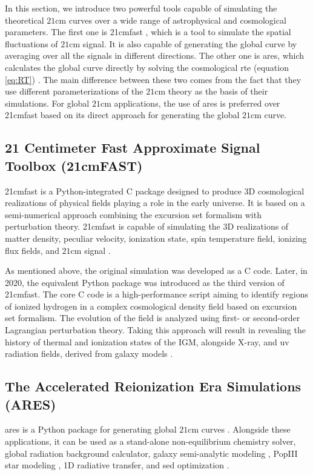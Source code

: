 \documentclass[12pt, TexShade, letterpaper]{report}
\begin{document}
In this section, we introduce two powerful tools capable of simulating the theoretical $\mathrm{21cm}$ curves over a wide range of astrophysical and cosmological parameters. The first one is \gls{21cmfast} \cite{21cmfast_c, 21cmfast_python}, which is a tool to simulate the spatial fluctuations of $\mathrm{21cm}$ signal. It is also capable of generating the global curve by averaging over all the signals in different directions. The other one is \gls{ares}, which calculates the global curve directly by solving the cosmological \gls{rte} (equation \ref{eq:RT}) \cite{ares2014jordan}. The main difference between these two comes from the fact that they use different parameterizations of the $\mathrm{21cm}$ theory as the basis of their simulations. For global $\mathrm{21cm}$ applications, the use of \gls{ares} is preferred over \gls{21cmfast} based on its direct approach for generating the global $\mathrm{21cm}$ curve. \par

\subsection{21 Centimeter Fast Approximate Signal Toolbox (21cmFAST)}
\gls{21cmfast} is a Python-integrated C package designed to produce 3D cosmological realizations of physical fields playing a role in the early universe. It is based on a semi-numerical approach combining the excursion set formalism with perturbation theory. \gls{21cmfast} is capable of simulating the 3D realizations of matter density, peculiar velocity, ionization state, spin temperature field, ionizing flux fields, and $\mathrm{21cm}$ signal \cite{21cmfast_c, 21cmfast_python, 21cmfast_documentation, 21cmfast_github}.\par
As mentioned above, the original simulation was developed as a C code. Later, in 2020, the equivalent Python package was introduced as the third version of \gls{21cmfast}. The core C code is a high-performance script aiming to identify regions of ionized hydrogen in a complex cosmological density field based on excursion set formalism. The evolution of the field is analyzed using first- or second-order Lagrangian perturbation theory. Taking this approach will result in revealing the history of thermal and ionization states of the IGM, alongside X-ray, and \gls{uv} radiation fields, derived from galaxy models \cite{21cmfast_c}. \par

\subsection{The Accelerated Reionization Era Simulations (ARES)}
\gls{ares} is a Python package for generating global $\mathrm{21cm}$ curves \cite{ares2014jordan, ares_documentation, ares_github}. Alongside these applications, it can be used as a stand-alone non-equilibrium chemistry solver, global radiation background calculator,  galaxy semi-analytic modeling \cite{jordan_galaxy_1, jordan_galaxy_2, jordan_galaxy_3}, PopIII star modeling \cite{jordan_star}, 1D radiative transfer, and \gls{sed} optimization \cite{jordan_SED}.\par
\end{document}
